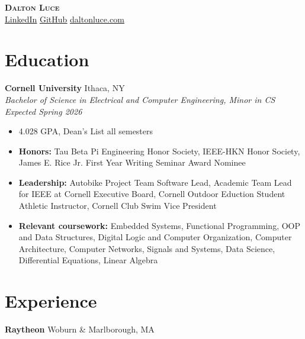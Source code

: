 \documentclass[letterpaper,10pt]{article}
\newcommand{\company}[2]{
    \vspace{7pt}
    {\large \textbf{#1}}
    \hfill
    {\normalsize {#2}}
    \\
}
\newcommand{\resumeEntry}[4]{
    \vspace{5pt}
    {\large \textbf{#1}}
    \hfill
    {\normalsize #2}
    \\
    \textit{#3} \hfill \textit{#4}
    \vspace{1pt}
}
\newcommand{\itemsBegin}{
    \begin{itemize}[leftmargin=0.2in, labelsep=0.05in, itemsep=0pt, parsep=1pt, topsep=0pt, partopsep=0pt]
    \small
}
\newcommand{\itemsEnd}{\end{itemize}}
\begin{document}
\textbf{\huge \scshape Dalton Luce} \\
\vspace{2pt}
\small
\addressConditional{}   %
\phoneConditional{}     %
\emailConditional{}     %
\href{https://www.linkedin.com/in/dalton-luce/}{\underline{LinkedIn}} %
\hspace{10pt}
\href{https://github.com/da-luce}{\underline{GitHub}}                 %
\hspace{10pt}
\href{https://daltonluce.com/}{\underline{daltonluce.com}}            %
\vspace{-5pt}

\section{Education}

    \resumeEntry{Cornell University}
        {Ithaca, NY}
        {Bachelor of Science in Electrical and Computer Engineering, Minor in CS}
        {Expected Spring 2026}

    \itemsBegin{}
        \item 4.028 GPA, Dean's List all semesters
        \item \textbf{Honors:} Tau Beta Pi Engineering Honor Society, IEEE-HKN Honor Society, James E. Rice Jr. First Year Writing Seminar Award Nominee
        \item \textbf{Leadership:} Autobike Project Team Software Lead, Academic Team Lead for IEEE at Cornell Executive Board, Cornell Outdoor Eduction Student Athletic Instructor, Cornell Club Swim Vice President
        \item \textbf{Relevant coursework:} Embedded Systems, Functional Programming, OOP and Data Structures, Digital Logic and Computer Organization, Computer Architecture, Computer Networks, Signals and Systems, Data Science, Differential Equations, Linear Algebra
    \itemsEnd{}

\section{Experience}

    \company{Raytheon}{Woburn \& Marlborough, MA}
\end{document}
